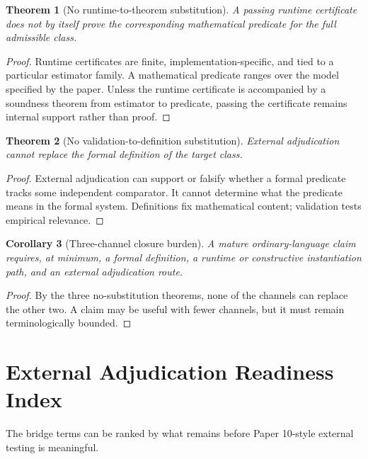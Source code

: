 \documentclass[11pt,a4paper]{article}
\newtheorem{theorem}{Theorem}[section]
\newtheorem{corollary}[theorem]{Corollary}
\theoremstyle{definition}
\begin{document}
\begin{theorem}[No runtime-to-theorem substitution]
A passing runtime certificate does not by itself prove the corresponding
mathematical predicate for the full admissible class.
\end{theorem}

\begin{proof}
Runtime certificates are finite, implementation-specific, and tied to a
particular estimator family. A mathematical predicate ranges over the model
specified by the paper. Unless the runtime certificate is accompanied by a
soundness theorem from estimator to predicate, passing the certificate remains
internal support rather than proof.
\end{proof}

\begin{theorem}[No validation-to-definition substitution]
External adjudication cannot replace the formal definition of the target
class.
\end{theorem}

\begin{proof}
External adjudication can support or falsify whether a formal predicate tracks
some independent comparator. It cannot determine what the predicate means in
the formal system. Definitions fix mathematical content; validation tests
empirical relevance.
\end{proof}

\begin{corollary}[Three-channel closure burden]
A mature ordinary-language claim requires, at minimum, a formal definition, a
runtime or constructive instantiation path, and an external adjudication route.
\end{corollary}

\begin{proof}
By the three no-substitution theorems, none of the channels can replace the
other two. A claim may be useful with fewer channels, but it must remain
terminologically bounded.
\end{proof}

\section{External Adjudication Readiness Index}

The bridge terms can be ranked by what remains before Paper 10-style external
testing is meaningful.
\end{document}
